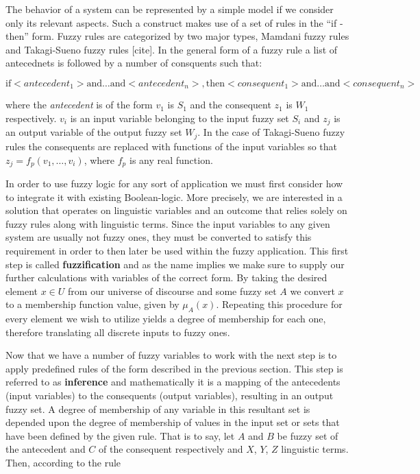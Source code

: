 The behavior of a system can be represented by a simple model if we consider only its relevant aspects. Such a construct makes use of a set of rules in the ``if - then'' form. Fuzzy rules are categorized by two major types, Mamdani fuzzy rules and Takagi-Sueno fuzzy rules [cite]. In the general form of a fuzzy rule a list of antecednets is followed by a number of consquents such that:

\[
	\text{if}  <antecedent_1> \text{and} \ldots \text{and} <antecedent_n>,	\text{then} <consequent_1> \text{and}  \ldots \text{and} <consequent_n>
\]

where the \textit{antecedent} is of the form $v_1$ is $S_1$ and the consequent $z_1$ is $W_1$ respectively. $v_i$ is an input variable belonging to the input fuzzy set $S_i$ and $z_j$ is an output variable of the output fuzzy set $W_j$.
In the case of Takagi-Sueno fuzzy rules the consequents are replaced with functions of the input variables so that $z_j = f_p(v_1, \ldots, v_i)$, where $f_p$ is any real function.

In order to use fuzzy logic for any sort of application we must first consider how to integrate it with existing Boolean-logic. More precisely, we are interested in a solution that operates on linguistic variables and an outcome that relies solely on fuzzy rules along with linguistic terms. Since the input variables to any given system are usually not fuzzy ones, they must be converted to satisfy this requirement in order to then later be used within the fuzzy application. This first step is called \textbf{fuzzification} and as the name implies we make sure to supply our further calculations with variables of the correct form. By taking the desired element $x \in U$ from our universe of discourse and some fuzzy set $A$ we convert $x$ to a membership function value, given by $\mu_{A}(x)$. Repeating this procedure for every element we wish to utilize yields a degree of membership for each one, therefore translating all discrete inputs to fuzzy ones.

Now that we have a number of fuzzy variables to work with the next step is to apply predefined rules of the form described in the previous section. This step is referred to as \textbf{inference} and mathematically it is a mapping of the antecedents (input variables) to the consequents (output variables), resulting in an output fuzzy set. A degree of membership of any variable in this resultant set is depended upon the degree of membership of values in the input set or sets that have been defined by the given rule. That is to say, let $A$ and $B$ be fuzzy set of the antecedent and $C$ of the consequent respectively and $X$, $Y$, $Z$ linguistic terms. Then, according to the rule 

